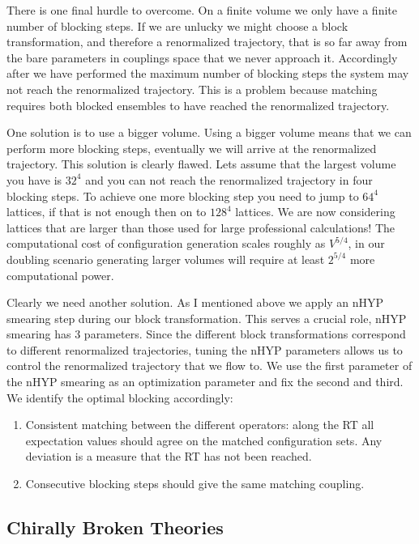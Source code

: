 There is one final hurdle to overcome.
On a finite volume we only have a finite number of blocking steps.
If we are unlucky we might choose a block transformation, and therefore a renormalized trajectory, that is so far away from the bare parameters in couplings space that we never approach it.
Accordingly after we have performed the maximum number of blocking steps the system may not reach the renormalized trajectory.
This is a problem because matching requires both blocked ensembles to have reached the renormalized trajectory.

One solution is to use a bigger volume.
Using a bigger volume means that we can perform more blocking steps, eventually we will arrive at the renormalized trajectory.
This solution is clearly flawed.
Lets assume that the largest volume you have is $32^4$ and you can not reach the renormalized trajectory in four blocking steps.
To achieve one more blocking step you need to jump to $64^4$ lattices, if that is not enough then on to $128^4$ lattices.
We are now considering lattices that are larger than those used for large professional calculations!
The computational cost of configuration generation scales roughly as $V^{5/4}$, in our doubling scenario generating larger volumes will require at least $2^{5/4}$ more computational power.

Clearly we need another solution.
As I mentioned above we apply an nHYP smearing step during our block transformation.
This serves a crucial role, nHYP smearing has 3 parameters.
Since the different block transformations correspond to different renormalized trajectories, tuning the nHYP parameters allows us to control the renormalized trajectory that we flow to.
We use the first parameter of the nHYP smearing as an optimization parameter and fix the second and third.
We identify the optimal blocking accordingly:
\begin{enumerate}
  \item Consistent matching between the different operators: along the RT all expectation values should agree on the matched configuration sets. Any deviation is a measure that the RT has not been reached.
  \item Consecutive blocking steps should give the same matching coupling.
\end{enumerate}

\subsection{Chirally Broken Theories}

